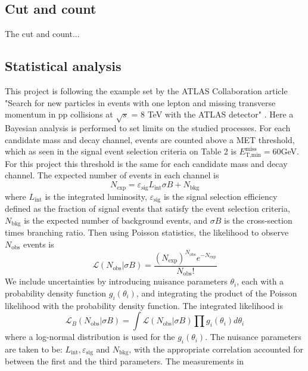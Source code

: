 \documentclass[14pt, a4paper]{book}
\begin{document}
\subsection{Cut and count}
The cut and count...





\subsection{Statistical analysis}
This project is following the example set by the ATLAS Collaboration article "Search for new particles in events with one lepton and missing transverse momentum in pp collisions at $\sqrt s$ = 8 TeV with the ATLAS detector" \cite{Stat}. Here a Bayesian analysis is performed to 
set limits on the studied processes. For each candidate mass and decay channel, events are counted above a MET threshold, which as seen in the signal event selection criteria on Table 2 is $E_{\text{T,min}}^{\text{miss}}=60$GeV. For this project this threshold is the same for 
each candidate mass and decay channel. The expected number of events in each channel is 
\begin{equation}
    N_{\text{exp}} = \varepsilon_{\text{sig}}L_{\text{int}}\sigma B + N_{\text{bkg}}
\end{equation}
where $L_{\text{int}}$ is the integrated luminosity, $\varepsilon_{\text{sig}}$ is the signal selection efficiency defined as the fraction of signal events that satisfy the event selection criteria, $N_{\text{bkg}}$ is the expected number of background events, and $\sigma B$ is 
the cross-section times branching ratio. Then using Poisson statistics, the likelihood to observe $N_{\text{obs}}$ events is
\begin{equation}
    \mathcal{L}(N_{\text{obs}}\vert \sigma B) = \frac{(N_{\text{exp}})^{N_{\text{obs}}}e^{-N_{\text{exp}}}}{N_{\text{obs}}!}
\end{equation}
We include uncertainties by introducing nuisance parameters $\theta_i$, each with a probability density function $g_i(\theta_i)$, and integrating the product of the Poisson likelihood with the probability density function. The integrated likelihood is
\begin{equation}
    \mathcal{L}_B(N_{\text{obs}}\vert \sigma B)=\int\mathcal{L}(N_{\text{obs}}\vert \sigma B)\prod g_i(\theta_i)d\theta_i
\end{equation}
where a log-normal distribution is used for the $g_i(\theta_i)$. The nuisance parameters are taken to be: $L_{\text{int}}, \varepsilon_{\text{sig}}$ and $N_{\text{bkg}}$, with the appropriate correlation accounted for between the first and the third parameters. The measurements in 
\end{document}

